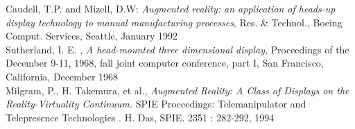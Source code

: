 \renewcommand{\bibname}{References}
\begin{thebibliography}{Abc 99}

 Caudell, T.P. and Mizell, D.W: {\sl Augmented reality: an application of heads-up display technology to manual manufacturing processes}, Res. \& Technol., Boeing Comput. Services, Seattle, January 1992\\

 Sutherland, I. E. , {\sl A head-mounted three dimensional display}, Proceedings of the December 9-11, 1968, fall joint computer conference, part I, San Francisco, California,  December 1968\\

 Milgram, P., H. Takemura, et al., {\sl Augmented Reality: A Class of Displays on the Reality-Virtuality Continuum.} SPIE Proceedings: Telemanipulator and Telepresence Technologies . H. Das, SPIE. 2351 : 282-292, 1994

\end{thebibliography}
